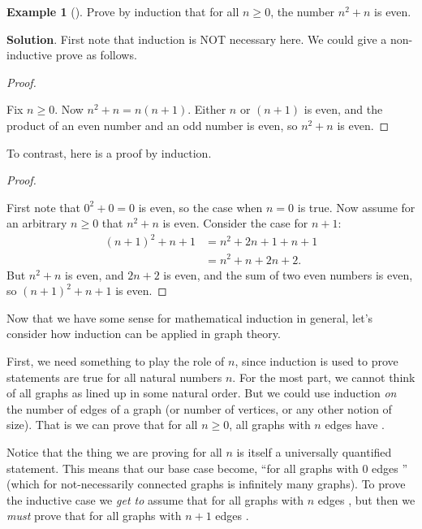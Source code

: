\documentclass[10pt,]{book}
\theoremstyle{plain}
\theoremstyle{definition}
\theoremstyle{definition}
\newtheorem{example}[theorem]{Example}
\theoremstyle{definition}
\numberwithin{equation}{chapter}
\newcommand{\amp}{&}
\begin{document}
\begin{example}[]\label{example-7}
\hypertarget{p-231}{}%
Prove by induction that for all \(n \ge 0\), the number \(n^2 + n\) is even.%
\par\smallskip%
\noindent\textbf{Solution}.\hypertarget{solution-10}{}\quad%
\hypertarget{p-232}{}%
First note that induction is NOT necessary here.  We could give a non-inductive prove as follows.%
\begin{proof}\hypertarget{proof-1}{}
\hypertarget{p-233}{}%
Fix \(n \ge 0\).  Now \(n^2 + n = n(n+1)\).  Either \(n\) or \((n+1)\) is even, and the product of an even number and an odd number is even, so \(n^2 + n\) is even.%
\end{proof}
\hypertarget{p-234}{}%
To contrast, here is a proof by induction.%
\begin{proof}\hypertarget{proof-2}{}
\hypertarget{p-235}{}%
First note that \(0^2 + 0 = 0\) is even, so the case when \(n = 0\) is true.  Now assume for an arbitrary \(n\ge 0\) that \(n^2 + n\) is even.  Consider the case for \(n+1\):%
\begin{align*}
(n+1)^2 + n+1 \amp = n^2 + 2n + 1 + n + 1\\
\amp = n^2 + n + 2n + 2.
\end{align*}
But \(n^2 + n\) is even, and \(2n + 2\) is even, and the sum of two even numbers is even, so \((n+1)^2 + n+1\) is even.%
\end{proof}
\end{example}
\hypertarget{p-236}{}%
Now that we have some sense for mathematical induction in general, let's consider how induction can be applied in graph theory.%
\par
\hypertarget{p-237}{}%
First, we need something to play the role of \(n\), since induction is used to prove statements are true for all natural numbers \(n\).  For the most part, we cannot think of all graphs as lined up in some natural order.  But we could use induction \emph{on} the number of edges of a graph (or number of vertices, or any other notion of size).  That is we can prove that for all \(n\ge 0\), all graphs with \(n\) edges have \textellipsis{}.%
\par
\hypertarget{p-238}{}%
Notice that the thing we are proving for all \(n\) is itself a universally quantified statement. This means that our base case become, ``for all graphs with 0 edges \textellipsis{}'' (which for not-necessarily connected graphs is infinitely many graphs).  To prove the inductive case we \emph{get to} assume that for all graphs with \(n\) edges \textellipsis{}, but then we \emph{must} prove that for all graphs with \(n+1\) edges \textellipsis{}.%
\end{document}
